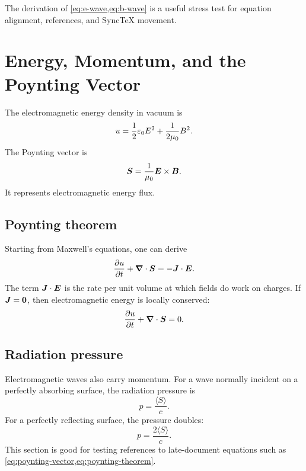 The derivation of \cref{eq:e-wave,eq:b-wave} is a useful stress test for equation alignment, references, and SyncTeX movement.

\newpage

\section{Energy, Momentum, and the Poynting Vector}
\label{sec:poynting}

The electromagnetic energy density in vacuum is
\begin{equation}
  u
  =
  \frac{1}{2}\varepsilon_0 E^2
  +
  \frac{1}{2\mu_0}B^2.
  \label{eq:energy-density}
\end{equation}
The Poynting vector is
\begin{equation}
  \bm{S}
  =
  \frac{1}{\mu_0}
  \bm{E}\times\bm{B}.
  \label{eq:poynting-vector}
\end{equation}
It represents electromagnetic energy flux.

\subsection{Poynting theorem}

Starting from Maxwell's equations, one can derive
\begin{equation}
  \frac{\partial u}{\partial t}
  +
  \bm{\nabla} \cdot\bm{S}
  =
  -
  \bm{J}\cdot\bm{E}.
  \label{eq:poynting-theorem}
\end{equation}
The term \(\bm{J}\cdot\bm{E}\) is the rate per unit volume at which fields do work on charges.
If \(\bm{J}=\bm{0}\), then electromagnetic energy is locally conserved:
\begin{equation}
  \frac{\partial u}{\partial t}
  +
  \bm{\nabla} \cdot\bm{S}
  =
  0.
\end{equation}

\subsection{Radiation pressure}

Electromagnetic waves also carry momentum.
For a wave normally incident on a perfectly absorbing surface, the radiation pressure is
\begin{equation}
  p = \frac{\langle S\rangle}{c}.
\end{equation}
For a perfectly reflecting surface, the pressure doubles:
\begin{equation}
  p = \frac{2\langle S\rangle}{c}.
\end{equation}
This section is good for testing references to late-document equations such as \cref{eq:poynting-vector,eq:poynting-theorem}.

